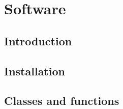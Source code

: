 

\chapter{Software}
\label{appendix:software}

\section{Introduction}

\section{Installation}

\section{Classes and functions}

